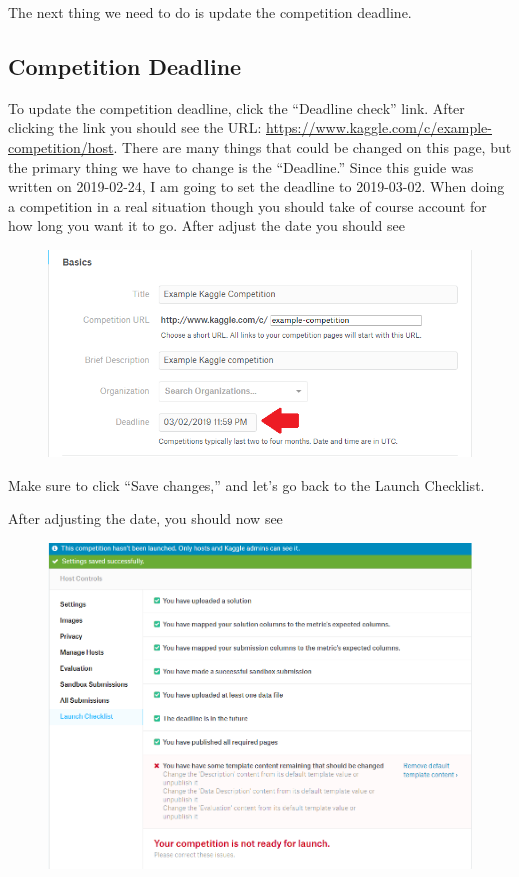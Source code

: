\documentclass{article}
\begin{document}
The next thing we need to do is update the competition deadline.

\subsection{Competition Deadline}\label{competition-deadline}

To update the competition deadline, click the ``Deadline check'' link.
After clicking the link you should see the URL:
\url{https://www.kaggle.com/c/example-competition/host}. There are many
things that could be changed on this page, but the primary thing we have
to change is the ``Deadline.'' Since this guide was written on
2019-02-24, I am going to set the deadline to 2019-03-02. When doing a
competition in a real situation though you should take of course account
for how long you want it to go. After adjust the date you should see

\begin{figure}[H]
    \centering
    \includegraphics[width=\linewidth]{figures/date-adjustment.PNG}
\end{figure}

Make sure to click ``Save changes,'' and let's go back to the Launch
Checklist.

After adjusting the date, you should now see

\begin{figure}[H]
    \centering
    \includegraphics[width=\linewidth]{figures/launch-checklist4.PNG}
\end{figure}
\end{document}
